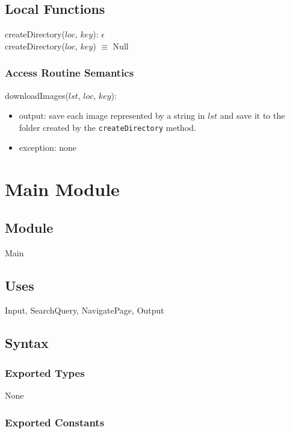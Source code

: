\documentclass{article}
\begin{document}
\subsection* {Local Functions}

\noindent createDirectory($loc$, $key$): $\epsilon$ \\
createDirectory($loc$, $key$) $\equiv$ Null

\subsubsection* {Access Routine Semantics}

\noindent downloadImages($lst$, $loc$, $key$):
\begin{itemize}
\item output: save each image represented by a string in $lst$ and save it to the folder created by the \texttt{createDirectory} method.
\item exception: none
\end{itemize}

\newpage

\section*{Main Module}

\subsection* {Module}

Main

\subsection* {Uses}

Input, SearchQuery, NavigatePage, Output

\subsection* {Syntax}

\subsubsection* {Exported Types}

None

\subsubsection* {Exported Constants}
\end{document}
